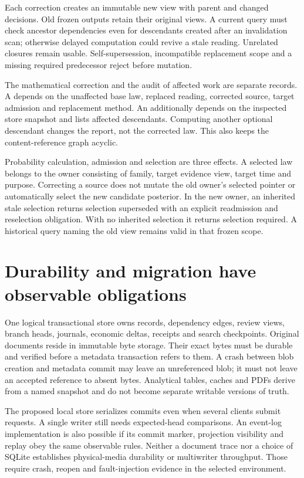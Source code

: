 Each correction creates an immutable new view with parent and changed decisions.
Old frozen outputs retain their original views. A current query must check
ancestor dependencies even for descendants created after an invalidation scan;
otherwise delayed computation could revive a stale reading. Unrelated closures
remain usable. Self-supersession, incompatible replacement scope and a missing
required predecessor reject before mutation.

The mathematical correction and the audit of affected work are separate records.
A  depends on the unaffected base law, replaced reading,
corrected source, target admission and replacement method. An
 additionally depends on the inspected store snapshot
and lists affected descendants. Computing another optional descendant changes
the report, not the corrected law. This also keeps the content-reference graph
acyclic.

Probability calculation, admission and selection are three effects. A selected
law belongs to the owner consisting of family, target evidence view, target time
and purpose. Correcting a source does not mutate the old owner's selected
pointer or automatically select the new candidate posterior. In the new owner,
an inherited stale selection returns selection superseded with an explicit
readmission and reselection obligation. With no inherited selection it returns
selection required. A historical query naming the old view remains valid in
that frozen scope.

\section{Durability and migration have observable obligations}
\label{sec:durability-migration}

One logical transactional store owns records, dependency edges, review views,
branch heads, journals, economic deltas, receipts and search checkpoints.
Original documents reside in immutable byte storage. Their exact bytes must
be durable and verified before a metadata transaction refers to them. A crash
between blob creation and metadata commit may leave an unreferenced blob; it
must not leave an accepted reference to absent bytes. Analytical tables, caches
and PDFs derive from a named snapshot and do not become separate writable
versions of truth.

The proposed local store serializes commits even when several clients submit
requests. A single writer still needs expected-head comparisons. An event-log
implementation is also possible if its commit marker, projection visibility and
replay obey the same observable rules. Neither a document trace nor a choice
of SQLite establishes physical-media durability or multiwriter throughput.
Those require crash, reopen and fault-injection evidence in the selected
environment.

